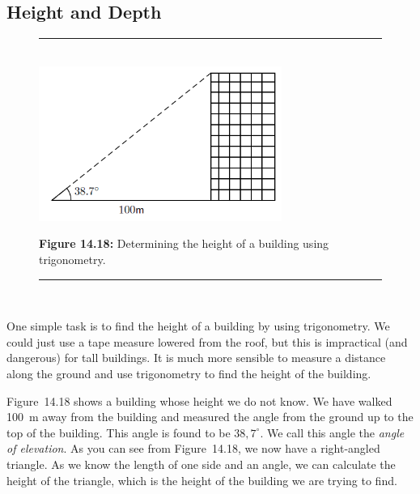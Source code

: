             \subsection{ Height and Depth}
            \nopagebreak
    \setcounter{subfigure}{0}
	\begin{figure}[H] %
    \begin{center}
    \rule[.1in]{\figurerulewidth}{.005in} \\
        \label{m39411*uid26!!!underscore!!!media}\label{m39411*uid26!!!underscore!!!printimage}\includegraphics[width=300px]{col11306.imgs/m39411_MG10C15_012.png} %
      \vspace{2pt}
    \vspace{\rubberspace}\par \begin{cnxcaption}
	  \small \textbf{Figure 14.18: }Determining the height of a building using trigonometry.
	\end{cnxcaption}
    \vspace{.1in}
    \rule[.1in]{\figurerulewidth}{.005in} \\
    \end{center}
 \end{figure}       
        \label{m39411*id81653}One simple task is to find the height of a building by using trigonometry. We could just use a tape measure lowered from the roof, but this is impractical (and dangerous) for tall buildings. It is much more sensible to measure a distance along the ground and use trigonometry to find the height of the building.\par 
        \label{m39411*id81658}Figure~14.18 shows a building whose height we do not know. We have walked 100~m away from the building and measured the angle from the ground up to the top of the building. This angle is found to be $38,{7}^{\circ }$. We call this angle the \textsl{angle of elevation}. As you can see from Figure~14.18, we now have a right-angled triangle. As we know the length of one side and an angle, we can calculate the height of the triangle, which is the height of the building we are trying to find.\par 
